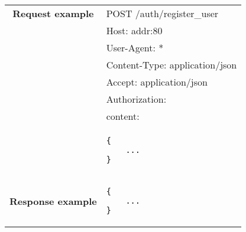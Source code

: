 \begin{adjustwidth}{1cm}{}
\begin{longtable}{|c|l|}
            \hline
             \textbf{Request example}
             & POST /auth/register\_user \\
             & Host: addr:80\\
             & User-Agent: * \\
             & Content-Type: application/json\\
             & Accept: application/json\\
             & Authorization: \\
             & content: \\
            & \begin{minipage}[t]{0.5\textwidth}
                \begin{adjustwidth}{1.5cm}{}
                \begin{verbatim}
{
    ...
}
                \end{verbatim}
                \end{adjustwidth}
              \end{minipage} \\
            \hline
             \textbf{Response example} & 
              \begin{minipage}[t]{0.5\textwidth}
                \begin{adjustwidth}{1.5cm}{}
                \begin{verbatim}
{
    ...
}
                \end{verbatim}
                \end{adjustwidth}
              \end{minipage} \\
              \hline
        \end{longtable}
    \end{adjustwidth}
    
